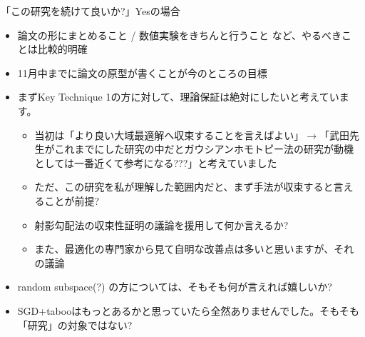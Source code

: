 \documentclass[13pt,aspectratio=169,table,dvipdfmx]{beamer}
\begin{document}
    \begin{frame}{「この研究を続けて良いか?」Yesの場合}
        \begin{itemize}
            \item 論文の形にまとめること / 数値実験をきちんと行うこと など、やるべきことは比較的明確
            \item 11月中までに論文の原型が書くことが今のところの目標
            \item まずKey Technique 1の方に対して、理論保証は絶対にしたいと考えています。
                  \begin{itemize}
                      \item 当初は「より良い大域最適解へ収束することを言えばよい」$\to$「武田先生がこれまでにした研究の中だとガウシアンホモトピー法の研究が動機としては一番近くて参考になる???」と考えていました
                      \item ただ、この研究を私が理解した範囲内だと、まず手法が収束すると言えることが前提?
                      \item 射影勾配法の収束性証明の議論を援用して何か言えるか?
                      \item また、最適化の専門家から見て自明な改善点は多いと思いますが、それの議論
                  \end{itemize}
            \item random subspace(?) の方については、そもそも何が言えれば嬉しいか?
            \item SGD+tabooはもっとあるかと思っていたら全然ありませんでした。そもそも「研究」の対象ではない?
        \end{itemize}
    \end{frame}
\fi
\end{document}
